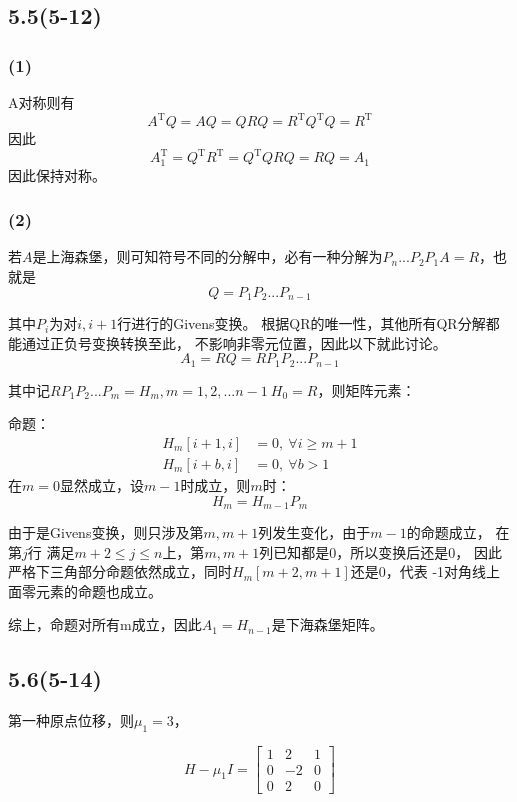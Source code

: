 \documentclass[UTF8,zihao=5]{ctexart}
\newcommand{\trans}[0]{^\mathrm{T}}
\begin{document}
\subsection*{5.5(5-12)}

\subsubsection*{(1)}

A对称则有
$$
    A\trans Q = A Q = QRQ=R\trans Q\trans Q = R\trans
$$
因此
$$
    A_1\trans=Q\trans R\trans=Q\trans QRQ=RQ=A_1
$$
因此保持对称。

\subsubsection*{(2)}

若$A$是上海森堡，则可知符号不同的分解中，必有一种分解为$P_n...P_2P_1A=R$，也就是
$$
    Q=P_1P_2...P_{n-1}
$$

其中$P_i$为对$i,i+1$行进行的Givens变换。
根据QR的唯一性，其他所有QR分解都能通过正负号变换转换至此，
不影响非零元位置，因此以下就此讨论。
$$
    A_1=RQ=RP_1P_2...P_{n-1}
$$

其中记$RP_1P_2...P_m=H_m,m=1,2,...n-1\ H_0=R$，则矩阵元素：

命题：
$$
    \begin{aligned}
        H_m[i+1,i] &= 0,\ \forall i\geq m+1 \\
        H_m[i+b,i] &= 0,\ \forall b > 1
    \end{aligned}
$$
在$m=0$显然成立，设$m-1$时成立，则$m$时：
$$
H_{m}=H_{m-1}P_{m}
$$

由于是Givens变换，则只涉及第$m,m+1$列发生变化，由于$m-1$的命题成立，
在第$j$行
满足$m+2\leq j\leq n$上，第$m,m+1$列已知都是0，所以变换后还是0，
因此严格下三角部分命题依然成立，同时$H_m[m+2,m+1]$还是0，代表
-1对角线上面零元素的命题也成立。

综上，命题对所有m成立，因此$A_1=H_{n-1}$是下海森堡矩阵。

\subsection*{5.6(5-14)}

第一种原点位移，则$\mu_1=3$，

$$
H-\mu_1 I=
\left[\begin{array}{ccc} 1 & 2 & 1\\ 0 & -2 & 0\\ 0 & 2 & 0 \end{array}\right]
$$
\end{document}
